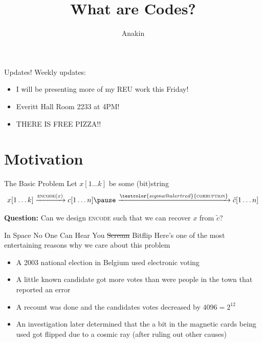\documentclass[aspectratio=169]{beamer}
\title{What are Codes?}
\subtitle{\cite{good_vid}}
\author{Anakin}
\date{}
\begin{document}

\begin{frame}
\titlepage
\end{frame}

\begin{frame}{Updates!}
  Weekly updates:
  \begin{itemize}
    \item I will be presenting more of my REU work \textcolor{sigma@mainblue}{this Friday}!
    \item Everitt Hall Room 2233 at 4PM!
    \item THERE IS FREE PIZZA!!
  \end{itemize}
\end{frame}

\section{Motivation}
\frame{\sectionpage}

\begin{frame}{The Basic Problem}
    Let $x[1\ldots k]$ be some (bit)string\pause
    \[
        x[1\ldots k] \xrightarrow[]{\textsc{encode}(x)} c[1 \ldots n] \pause \xrightarrow[]{\textcolor{sigma@alertred}{\textsc{corruption}}} \tilde{c}[1 \ldots n]
    \]\pause
    \begin{center}
        \textcolor{sigma@mainblue}{\textbf{Question:}} Can we design \textsc{encode} such that we can recover $x$ from $\tilde{c}$?
    \end{center}
\end{frame}

\begin{frame}{In Space No One Can Hear You \st{Scream} Bitflip}
    Here's one of the most entertaining reasons why we care about this problem
    \begin{itemize}
        \item A 2003 national election in Belgium used electronic voting \pause
        \item A little known candidate got more votes than were people in the town that reported an error \pause
        \item A recount was done and the candidates votes decreased by $4096 = 2^{12}$ \pause
        \item An investigation later determined that the a bit in the magnetic cards being used got flipped due to a cosmic ray (after ruling out other causes)
    \end{itemize}
\end{frame}
\end{document}
